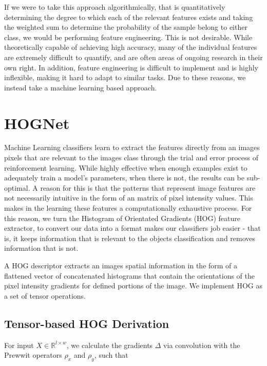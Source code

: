 \documentclass{article}
\begin{document}
If we were to take this approach algorithmically, that is quantitatively determining the degree to which each of the relevant features exists and taking the weighted sum to determine the probability of the sample belong to either class, we would be performing feature engineering. This is not desirable. While theoretically capable of achieving high accuracy, many of the individual features are extremely difficult to quantify, and are often areas of ongoing research in their own right. In addition, feature engineering is difficult to implement and is highly inflexible, making it hard to adapt to similar tasks. Due to these reasons, we instead take a machine learning based approach. 



\section{\label{sec:level1}HOGNet}

Machine Learning classifiers learn to extract the features directly from an images pixels that are relevant to the images class through the trial and error process of reinforcement learning. While highly effective when enough examples exist to adequately train a model's parameters, when there is not, the results can be sub-optimal. A reason for this is that the patterns that represent image features are not necessarily intuitive in the form of an matrix of pixel intensity values. This makes in the learning these features a computationally exhaustive process. For this reason, we turn the Histogram of Orientated Gradients (HOG) feature extractor, to convert our data into a format makes our classifiers job easier - that is, it keeps information that is relevant to the objects classification and removes information that is not. 

A HOG descriptor extracts an images spatial information in the form of a flattened vector of concatenated histograms that contain the orientations of the pixel intensity gradients for defined portions of the image. We implement HOG as a set of tensor operations.

\subsection{\label{sec:level2}Tensor-based HOG Derivation}


For input \(X \in \mathbb{R}^{l\times w}\), we calculate the gradients \(\Delta\) via convolution with the Prewwit operators \(\rho_x\) and \(\rho_y\), such that 
\end{document}
